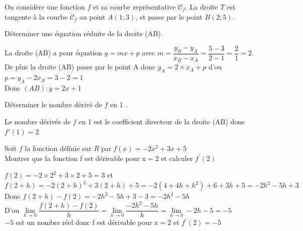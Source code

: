 \documentclass[a5paper,12pt]{article}        %
\begin{document}
\setcounter{numexo}{1}

On considère une fonction $f$ et sa courbe représentative $\mathscr{C}_{f}$. La droite $T$ est tangente à la courbe $\mathscr{C}_{f}$ au point $A(1 ; 3)$, et passe par le point $B(2 ; 5)$.
\begin{enumMet}
    \item Déterminer une équation réduite de la droite (AB).\\
    \begin{corrBox}
    La droite (AB) a pour équation $y=mx+p$ avec $m=\dfrac{y_B-y_A}{x_B-x_A}=\dfrac{5-3}{2-1}=\dfrac{2}{1}=2$.\\
    De plus la droite (AB) passe par le point A donc $y_A=2\times x_A+p$ d'ou $p=y_A-2x_A=3-2=1$\\
    Donc $(AB) : y=2x+1$
    \end{corrBox} 
    \item Déterminer le nombre dérivé de $f$ en 1 .\\
    \begin{corrBox}
        Le nombre dérivée de $f$ en 1 est le coefficient directeur de la droite (AB) donc $f'(1)=2$
    \end{corrBox}
\end{enumMet}


Soit $f$ la fonction définie sur $R \operatorname{par} f(x)=-2x^2+3x+5$\\
Montrer que la fonction f est dérivable pour $\mathrm{x}=2$ et calculer $f^{\prime}(2)$\\
\begin{corrBox}
    $f(2)=-2\times2^2+3\times2+5=3$ et\\ $f(2+h)=-2(2+h)^2+3(2+h)+5=-2(4+4h+h^2)+6+3h+5=-2h^2-5h+3$\\
    Donc $f(2+h)-f(2)=-2h^2-5h+3-3=-2h^2-5h$\\
    D'ou $\lim\limits_{h \rightarrow 0} \dfrac{f(2+h)-f(2)}{h}=\lim\limits_{h \rightarrow 0} \dfrac{-2h^2-5h}{h}=\lim\limits_{h \rightarrow 0} -2h-5=-5$\\
    $-5$ est un nombre réel donc f est dérivable pour $\mathrm{x}=2$ et $f^{\prime}(2)=-5$
\end{corrBox}
\end{document}
